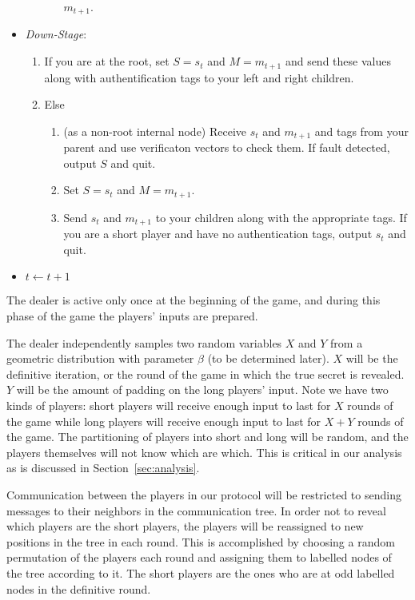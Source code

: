 \documentclass[12pt]{article}
\theoremstyle{definition}
\newcommand{\downStage}{\emph{Down-Stage}\xspace}
\begin{document}
\begin{algorithm}
\begin{itemize}
\begin{enumerate}
\begin{enumerate}
$m_{t+1}$.
\end{enumerate}
\end{enumerate}
\item[] \downStage:
\begin{enumerate}
\item If you are at the root, set $S=s_t$ and $M=m_{t+1}$ and send these 
values along with authentification tags to your left and right children.
\item Else
\begin{enumerate}
\item (as a non-root internal node) Receive $s_t$ and $m_{t+1}$ and tags from 
your parent and use verificaton vectors to check them. If fault detected, 
output $S$ and quit.
\item Set $S=s_t$ and $M=m_{t+1}$.
\item Send $s_t$ and $m_{t+1}$ to your children along with the appropriate tags.
If you are a short player and have no authentication tags, output $s_t$ and 
quit.
\end{enumerate}
\end{enumerate}
\item[] $t \leftarrow t+1$
\end{itemize}
\end{algorithm}

The dealer is active only once at the beginning of the game, and during 
this phase of the game the players' inputs are prepared.

The dealer independently samples two random variables $X$ and $Y$ from 
a geometric distribution with parameter $\beta$ (to be determined later). 
$X$ will be the definitive iteration, or the round of the game in which 
the true secret is revealed. $Y$ will be the amount of padding on the 
long players' input. Note we have two kinds of players: short players 
will receive enough input to last for $X$ rounds of the game while long 
players will receive enough input to last for $X+Y$ rounds of the game.
The partitioning of players into short and long will be random, and the 
players themselves will not know which are which. This is critical in 
our analysis as is discussed in Section~\ref{sec:analysis}.

Communication between the players in our protocol will be restricted 
to sending messages to their neighbors in the communication tree.  
In order not to reveal which players are the short players, the players 
will be reassigned to new positions in the tree in each round. This is 
accomplished by choosing a random permutation of the players each round 
and assigning them to labelled nodes of the tree according to it.
The short players are the ones who are at odd labelled nodes in the 
definitive round. 
\end{document}
